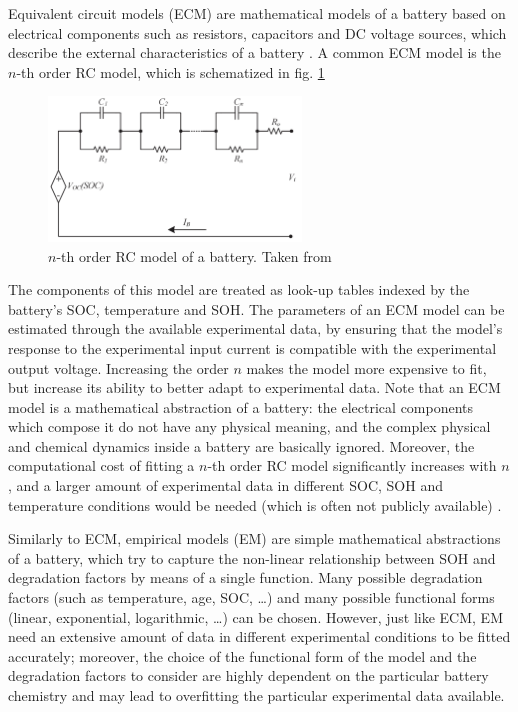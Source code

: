 Equivalent circuit models (ECM) \cite{survey1} are mathematical models of a battery based on electrical components such as resistors, capacitors and DC voltage sources, which describe the external characteristics of a battery \cite{ecm1}. A common ECM model is the $n$-th order RC model, which is schematized in fig. \ref{fig:rc_model}
\begin{figure}[hbt!]
    \centering
    \includegraphics[width=0.6\textwidth]{images/rc_model}
    \caption[$n$-th order RC model of a battery]{$n$-th order RC model of a battery. Taken from \cite{ecm2}}
    \label{fig:rc_model}
\end{figure}
The components of this model are treated as look-up tables indexed by the battery's SOC, temperature and SOH. The parameters of an ECM model can be estimated through the available experimental data, by ensuring that the model's response to the experimental input current is compatible with the experimental output voltage. Increasing the order $n$ makes the model more expensive to fit, but increase its ability to better adapt to experimental data. Note that an ECM model is a mathematical abstraction of a battery: the electrical components which compose it do not have any physical meaning, and the complex physical and chemical dynamics inside a battery are basically ignored. Moreover, the computational cost of fitting a $n$-th order RC model significantly increases with $n$, and a larger amount of experimental data in different SOC, SOH and temperature conditions would be needed (which is often not publicly available) \cite{survey4}.

Similarly to ECM, empirical models (EM) \cite{survey2} are simple mathematical abstractions of a battery, which try to capture the non-linear relationship between SOH and degradation factors by means of a single function. Many possible degradation factors (such as temperature, age, SOC, \dots) and many possible functional forms (linear, exponential, logarithmic, \dots) can be chosen. However, just like ECM, EM need an extensive amount of data in different experimental conditions to be fitted accurately; moreover, the choice of the functional form of the model and the degradation factors to consider are highly dependent on the particular battery chemistry and may lead to overfitting the particular experimental data available.

